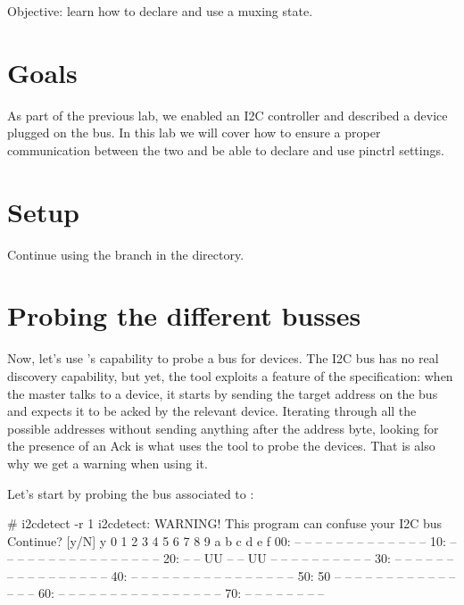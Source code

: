 {Objective: learn how to declare and use a muxing state.}

\section{Goals}

As part of the previous lab, we enabled an I2C controller and described
a device plugged on the bus. In this lab we will cover how to ensure a
proper communication between the two and be able to declare and use
pinctrl settings.

\section{Setup}

Continue using the  branch in the
 directory.

\section{Probing the different busses}

Now, let's use 's capability to probe a bus for
devices. The I2C bus has no real discovery capability, but yet, the tool
exploits a feature of the specification: when the master talks to a
device, it starts by sending the target address on the bus and expects
it to be acked by the relevant device. Iterating through all the
possible addresses without sending anything after the address byte,
looking for the presence of an Ack is what uses the tool to probe the
devices. That is also why we get a warning when using it.

Let's start by probing the bus associated to :

\begin{bashinput}
# i2cdetect -r 1
i2cdetect: WARNING! This program can confuse your I2C bus
Continue? [y/N] y
     0  1  2  3  4  5  6  7  8  9  a  b  c  d  e  f
00:          -- -- -- -- -- -- -- -- -- -- -- -- -- 
10: -- -- -- -- -- -- -- -- -- -- -- -- -- -- -- -- 
20: -- -- UU -- -- UU -- -- -- -- -- -- -- -- -- -- 
30: -- -- -- -- -- -- -- -- -- -- -- -- -- -- -- -- 
40: -- -- -- -- -- -- -- -- -- -- -- -- -- -- -- -- 
50: 50 -- -- -- -- -- -- -- -- -- -- -- -- -- -- -- 
60: -- -- -- -- -- -- -- -- -- -- -- -- -- -- -- -- 
70: -- -- -- -- -- -- -- --     
\end{bashinput}

